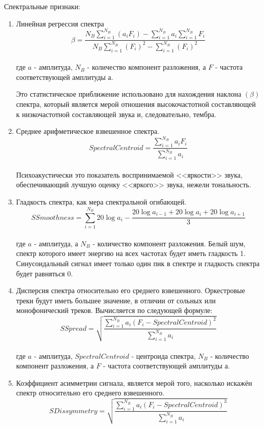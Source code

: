 Спектральные признаки:

\begin{enumerate}[label=\arabic*.]
\item Линейная регрессия спектра
\begin{equation}\label{eq:regression}
\beta = \frac{ N_B \sum\limits_{i=1}^{N_B} (a_i F_i) -  \sum\limits_{i=1}^{N_B} a_i  \sum\limits_{i=1}^{N_B} F_i}{N_B\sum\limits_{i=1}^{N_B} (F_i)^2 - \sum\limits_{i=1}^{N_B} (F_i)^2 }
\end{equation} \\
где $a$ - амплитуда,  $N_B$ - количество компонент разложения, а $F$ - частота соответствующей амплитуды $а$.

Это статистическое приближение использовано для нахождения наклона $(\beta)$ спектра, который является мерой отношения высокочастотной составляющей к низкочастотной составляющей звука и, следовательно, тембра. 
\item Среднее арифметическое взвешенное спектра.
\begin{equation}\label{eq:centroid}
SpectralCentroid = \frac{\sum \limits_{i=1}^{N_B} a_i F_i}{\sum \limits_{i=1}^{N_B} a_i}  
\end{equation}  \\
Психоакустически это показатель воспринимаемой <<яркости>> звука, обеспечивающий лучшую оценку <<яркого>> звука, нежели тональность.
\item Гладкость спектра, как мера спектральной огибающей.
\begin{equation}\label{eq:smooth}
SSmoothness = \sum \limits_{i=1}^{N_B} 20 \log a_i - \frac{20 \log a_{i-1} + 20 \log a_i + 20 \log a_{i+1}}{3} 
\end{equation}  \\
где $ a $ - амплитуда,  а $N_B$ - количество компонент разложения. 
Белый шум, спектр которого имеет энергию на всех частотах будет иметь гладкость 1. Синусоидальный сигнал имеет только один пик в спектре и гладкость спектра будет равняться 0. 
\item Дисперсия спектра относительно его среднего взвешенного.  Оркестровые треки будут иметь большее значение, в отличии от сольных или  монофонический треков. Вычисляется по следующей формуле:  
\begin{equation}\label{eq:spread}
SSpread = \sqrt{\frac{ \sum \limits_{i=1}^{N_B} a_i ( F_i - SpectralCentroid)^2 }{\sum \limits_{i=1}^{N_B} a_i}} 
\end{equation}  \\
где $a$ - амплитуда, $SpectralCentroid$ - центроида спектра,  $N_B$ - количество компонент разложения, а $F$ - частота соответствующей амплитуды $ а $.
\item Коэффициент асимметрии сигнала, является мерой того, насколько искажён спектр относительно  его среднего взвешенного.
\begin{equation}\label{eq:Dissymmetry}
SDissymmetry = \sqrt{\frac{ \sum \limits_{i=1}^{N_B} a_i ( F_i - SpectralCentroid)^3 }{\sum \limits_{i=1}^{N_B} a_i}} 
\end{equation}  
\end{enumerate}


